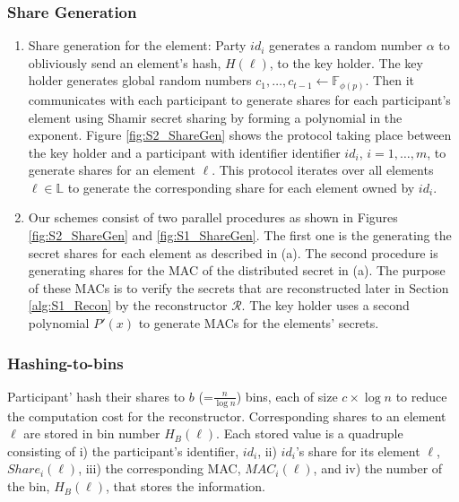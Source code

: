 \subsubsection{Share Generation}\label{ShareGen_S2}
\begin{enumerate}[label=(\alph*)]
    \item Share generation for the element: Party $id_i$ generates a random number $\alpha$ to obliviously send an element's hash, $H(\ell)$, to the key holder. The key holder generates global random numbers $c_1, \dots, c_{t-1} \gets \mathbb{F}_{\phi(p)}$. Then it communicates with each participant to generate shares for each participant's element using Shamir secret sharing by forming a polynomial in the exponent. Figure \ref{fig:S2_ShareGen} shows the protocol taking place between the key holder and a participant with identifier identifier $id_i$, $i =1, \dots, m$, to generate shares for an element $\ell$. This protocol iterates over all elements $\ell \in \mathbb{L}$ to generate the corresponding share for each element owned by $id_i$.
    \item Our schemes consist of two parallel procedures as shown in Figures \ref{fig:S2_ShareGen} and \ref{fig:S1_ShareGen}. The first one is the generating the secret shares for each element as described in (a). The second procedure is generating shares for the MAC of the distributed secret in (a). The purpose of these MACs is to verify the secrets that are reconstructed later in Section \ref{alg:S1_Recon} by the reconstructor $\mathcal{R}$. The key holder uses a second polynomial $P'(x)$ to generate MACs for the elements' secrets. 
\end{enumerate}

\subsubsection{Hashing-to-bins}\label{Binning_S2} 
Participant' hash their shares to $b$ (=$\frac{n}{\log{n}}$) bins, each of size $c\times \log{n}$ to reduce the computation cost for the reconstructor. Corresponding shares to an element $\ell$ are stored in bin number $H_B(\ell)$. Each stored value is a quadruple consisting of i) the participant's identifier, $id_i$, ii) $id_i$'s share for its element $\ell$, $Share_i(\ell)$, iii) the corresponding MAC, $MAC_i(\ell)$, and iv) the number of the bin, $H_B(\ell)$, that stores the information.


